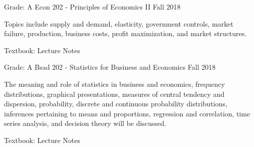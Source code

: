 
\begin{cventries}
  \cventry
  {Grade: A} %
  {Econ 202 - Principles of Economics II} %
  {} %
  {Fall 2018} %
  {
    \begin{cvitems} %
    \item {Topics include supply and demand, elasticity, government controls, market failure, production, business costs, profit maximization, and market structures. }
    \item {Textbook: Lecture Notes}
    \end{cvitems}
  }

  \cventry
  {Grade: A} %
  {Bsad 202 - Statistics for Business and Economics} %
  {} %
  {Fall 2018} %
  {
    \begin{cvitems} %
    \item {The meaning and role of statistics in business and economics, frequency distributions, graphical presentations, measures of central tendency and dispersion, probability, discrete and continuous probability distributions, inferences pertaining to means and proportions, regression and correlation, time series analysis, and decision theory will be discussed.}
    \item {Textbook: Lecture Notes}
    \end{cvitems}
  }

\end{cventries}
